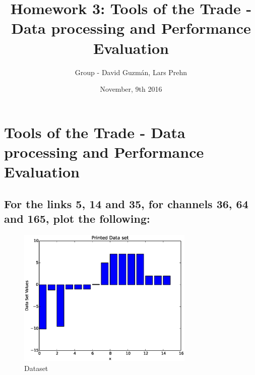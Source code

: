 \documentclass [12 pt , a4paper ] {article}
\begin{document}
\title{\huge \textbf { Homework 3: Tools of the Trade - Data processing and Performance
Evaluation}}
\date { November, 9th 2016 }
\author { Group  - David Guzm\'an, Lars Prehn }
\maketitle
\tableofcontents{}
\newpage
\section{Tools of the Trade - Data processing and Performance
Evaluation}
\subsection{For the links 5, 14 and 35, for channels 36, 64 and 165, plot the following:}

\begin{figure}[!ht]
  \centering
  \includegraphics[scale=0.2,width=0.75\textwidth, natwidth=7000,natheight=1000]{ecdf.eps}
  \caption{Dataset}
  \label{fig:Dataset}
\end{figure}


\printbibliography
\end{document}
